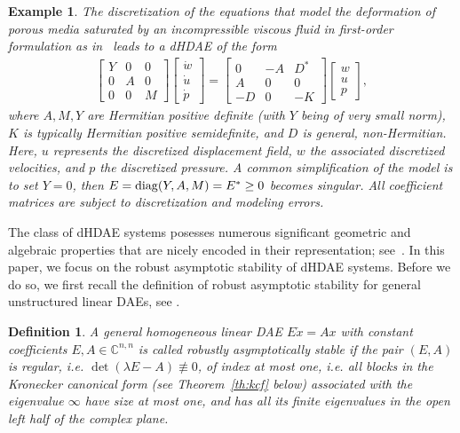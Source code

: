 \documentclass[11pt]{article}
\newtheorem{definition}[theorem]{Definition}
\newtheorem{example}[theorem]{Example}
\begin{document}
\begin{example}\label{ex:poro}{\rm
The discretization of the equations that model the deformation of porous media saturated by an incompressible viscous fluid in first-order formulation as in~\cite[Section~3.4]{AltMU21} leads to a dHDAE of the form
%
\begin{align}
\label{eqn:twoField:opMatrix3}
\begin{bmatrix}Y & 0 & 0\\ 0 & A & 0 \\ 0 & 0 & M\end{bmatrix}
  \begin{bmatrix} \dot{w} \\\dot{u}\\ \dot{p} \end{bmatrix}
  = \begin{bmatrix} 0 & -A & D^* \\ A & 0 & 0 \\ -D & 0 & -K \end{bmatrix}
  \begin{bmatrix} w\\ u\\ p \end{bmatrix} ,
\end{align}
%
where $A,M,Y$ are Hermitian positive definite (with $Y$ being  of very small norm), $K$ is typically Hermitian positive semidefinite, and $D$ is general, non-Hermitian. Here, $u$ represents the discretized displacement field, $w$ the associated discretized velocities, and $p$ the discretized pressure.
A common simplification of the model is to set $Y=0$, then $E={\rm diag}(Y,A,M)=E^*\geq 0$ becomes singular.
All coefficient matrices are subject to discretization and modeling errors.
}
\end{example}

The class of dHDAE systems posesses numerous significant geometric and algebraic properties that are nicely encoded in their representation; see~\cite{AchAM21,DalV98,JacZ12,OrtVME02,MehU23}.
In this paper, we focus on the robust asymptotic stability of dHDAE systems. Before we do so, we first recall the definition of robust asymptotic stability for general unstructured linear DAEs, see \cite{ByeN93,DuLM13}.
%
\begin{definition}\label{def:robasyst}
A general homogeneous linear DAE $E\dot x=Ax$ with constant coefficients
$E,A\in \mathbb C^{n,n}$ is called
\emph{robustly asymptotically stable} if the pair $(E,A)$ is regular, i.e. $\det (\lambda E-A)\not \equiv 0$,  of index at most one, i.e. all blocks in the Kronecker canonical form (see Theorem~\ref{th:kcf} below) associated with the eigenvalue $\infty$ have size at most one,  and has all its finite eigenvalues in the open left half of the complex plane.
\end{definition}
\end{document}

